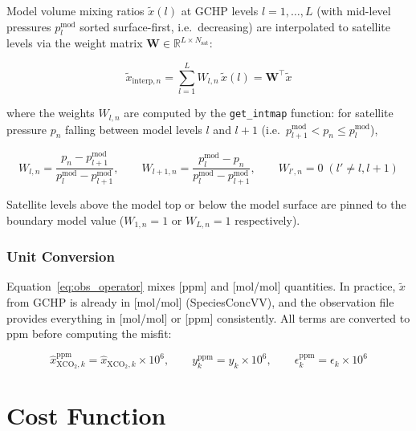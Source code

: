 \documentclass[12pt]{article}
\begin{document}
Model volume mixing ratios $\tilde{x}(l)$ at GCHP levels $l = 1,\ldots,L$ (with
mid-level pressures $p_l^{\mathrm{mod}}$ sorted surface-first, i.e.\ decreasing)
are interpolated to satellite levels via the weight matrix
$\mathbf{W} \in \mathbb{R}^{L \times N_{\mathrm{sat}}}$:

\begin{equation}
  \tilde{x}_{\mathrm{interp},n} = \sum_{l=1}^{L} W_{l,n}\,\tilde{x}(l)
  = \mathbf{W}^\top \tilde{x}
  \label{eq:interp_fwd}
\end{equation}

where the weights $W_{l,n}$ are computed by the \texttt{get\_intmap} function:
for satellite pressure $p_n$ falling between model levels $l$ and $l+1$
(i.e.\ $p_{l+1}^{\mathrm{mod}} < p_n \le p_l^{\mathrm{mod}}$),

\begin{equation}
  W_{l,n} = \frac{p_n - p_{l+1}^{\mathrm{mod}}}
                 {p_l^{\mathrm{mod}} - p_{l+1}^{\mathrm{mod}}}, \qquad
  W_{l+1,n} = \frac{p_l^{\mathrm{mod}} - p_n}
                   {p_l^{\mathrm{mod}} - p_{l+1}^{\mathrm{mod}}}, \qquad
  W_{l',n} = 0 \; (l' \neq l, l{+}1)
  \label{eq:weights}
\end{equation}

Satellite levels above the model top or below the model surface are pinned to
the boundary model value ($W_{1,n}=1$ or $W_{L,n}=1$ respectively).

\subsubsection{Unit Conversion}

Equation~\eqref{eq:obs_operator} mixes [ppm] and [mol/mol] quantities. In
practice, $\tilde{x}$ from GCHP is already in [mol/mol] (SpeciesConcVV),
and the observation file provides everything in [mol/mol] or [ppm] consistently.
All terms are converted to ppm before computing the misfit:

\begin{equation}
  \hat{x}_{\mathrm{XCO}_2,k}^{\mathrm{ppm}} = \hat{x}_{\mathrm{XCO}_2,k} \times 10^6,
  \qquad
  y_k^{\mathrm{ppm}} = y_k \times 10^6,
  \qquad
  \epsilon_k^{\mathrm{ppm}} = \epsilon_k \times 10^6
\end{equation}

\section{Cost Function}
\end{document}
